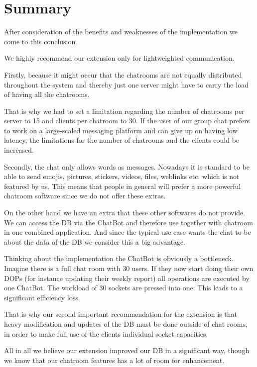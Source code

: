 \section{Summary}
\label{sec:summary}

After consideration of the benefits and weaknesses of the implementation we come to this conclusion.

We highly recommend our extension only for lightweighted communication. 

Firstly, because it might occur that the chatrooms are not equally distributed throughout the system and thereby just one server might have to carry the load of having all the chatrooms. 

That is why we had to set a limitation regarding the number of chatrooms per server to 15 and clients per chatroom to 30. If the user of our group chat prefers to work on a large-scaled messaging platform and can give up on having low latency, the limitations for the number of chatrooms and the clients could be increased.

Secondly, the chat only allows words as messages. Nowadays it is standard to be able to send emojis, pictures, stickers, videos, files, weblinks etc. which is not featured by us. This means that people in general will prefer a more powerful chatroom software since we do not offer these extras.

On the other hand we have an extra that these other softwares do not provide. We can access the DB via the ChatBot and therefore use together with chatroom in one combined application. And since the typical use case wants the chat to be about the data of the DB we consider this a big advantage.

Thinking about the implementation the ChatBot is obviously a bottleneck. Imagine there is a full chat room with 30 users. If they now start doing their own DOPs (for instance updating their weekly report) all operations are executed by one ChatBot. The workload of 30 sockets are pressed into one. This leads to a significant efficiency loss.

That is why our second important recommendation for the extension is that heavy modification and updates of the DB must be done outside of chat rooms, in order to make full use of the clients individual socket capacities.

All in all we believe our extension improved our DB in a significant way, though we know that our chatroom features has a lot of room for enhancement.
